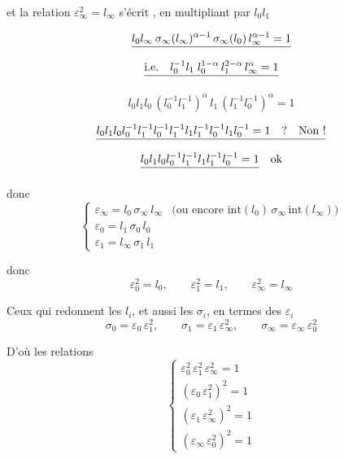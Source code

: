 \documentclass[11pt,a4paper]{article}
\begin{document}
et la relation $\varepsilon_\infty^2 = l_\infty$ s'écrit , en
multipliant par $l_0 l_1$

\[
\struck{l_0 l_\infty\, \sigma_\infty(l_\infty)^{\alpha-1}\, \sigma_\infty(l_0)\, l_\infty^{\alpha-1} = 1}
\]
\[
\struck{\text{i.e.}\quad l_0^{-1} l_1\; l_0^{1-\alpha}\, l_1^{2-\alpha}\, l_\infty^{\alpha} = 1}
\]


\[
l_0 l_1 l_0\, (l_0^{-1} l_1^{-1})^{\alpha}\, l_1\, (l_1^{-1} l_0^{-1})^{\alpha} = 1
\]

\[
\struck{l_0 l_1 l_0 l_0^{-1} l_1^{-1} l_0^{-1} l_1^{-1} l_1 l_1^{-1} l_0^{-1} l_1 l_0^{-1} = 1 \quad ? \quad \text{Non !}}
\]
\[
\struck{l_0 l_1 l_0 l_0^{-1} l_1^{-1} l_1 l_1^{-1} l_0^{-1} = 1} \quad \text{ok}
\]


donc
\[
\begin{cases}
\varepsilon_\infty = l_0\, \sigma_\infty\, l_\infty & \bigl(\text{ou encore } \mathrm{int}(l_0)\,\sigma_\infty\, \mathrm{int}(l_\infty)\bigr) \\
\varepsilon_0 = l_1\, \sigma_0\, l_0 \\
\varepsilon_1 = l_\infty\, \sigma_1\, l_1
\end{cases}
\]


donc
\[
\varepsilon_0^2 = l_0, \qquad \varepsilon_1^2 = l_1, \qquad \varepsilon_\infty^2 = l_\infty
\]

Ceux qui redonnent les $l_i$, et aussi les $\sigma_i$,  en
termes des $\varepsilon_i$
\[
\sigma_0 = \varepsilon_0\, \varepsilon_1^2, \qquad
\sigma_1 = \varepsilon_1\, \varepsilon_\infty^2, \qquad
\sigma_\infty = \varepsilon_\infty\, \varepsilon_0^2
\]

D'où les relations
\[
\begin{cases}
\varepsilon_0^2\, \varepsilon_1^2\, \varepsilon_\infty^2 = 1 \\
(\varepsilon_0\, \varepsilon_1^2)^2 = 1 \\
(\varepsilon_1\, \varepsilon_\infty^2)^2 = 1 \\
(\varepsilon_\infty\, \varepsilon_0^2)^2 = 1
\end{cases}
\]
\end{document}
